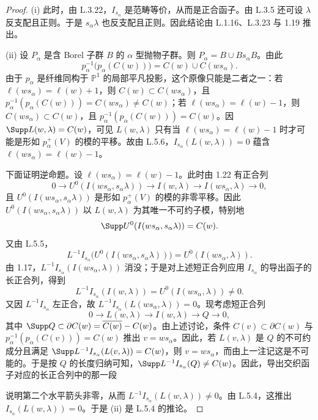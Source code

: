\begin{proof}
(i) 此时，由 L.3.22，$I_{s_\alpha}$ 是范畴等价，从而是正合函子。由 L.3.5 还可设 $\lambda$ 反支配且正则。于是 $s_\alpha\lambda$ 也反支配且正则。因此结论由 L.1.16、L.3.23 与 1.19 推出。

(ii) 设 $P_\alpha$ 是含 Borel 子群 $B$ 的 $\alpha$ 型抛物子群。则 $P_\alpha=B\cup Bs_\alpha B$。由此
$$p_\alpha^{-1}\bigl(p_\alpha(C(w))\bigr)=C(w)\cup C(ws_\alpha).$$
由于 $p_\alpha$ 是纤维同构于 $\mathbb{P}^1$ 的局部平凡投影，这个原像只能是二者之一：若 $\ell(ws_\alpha)=\ell(w)+1$，则 $C(w)\subset C(ws_\alpha)$，且 $p_\alpha^{-1}(p_\alpha(C(w)))=C(ws_\alpha)\neq C(w)$；若 $\ell(ws_\alpha)=\ell(w)-1$，则 $C(ws_\alpha)\subset C(w)$，且 $p_\alpha^{-1}(p_\alpha(C(w)))=C(w)$。因 $\Supp L(w,\lambda)=C(w)$，可见 $L(w,\lambda)$ 只有当 $\ell(ws_\alpha)=\ell(w)-1$ 时才可能是形如 $p_\alpha^+(V)$ 的模的平移。故由 L.5.6，$I_{s_\alpha}(L(w,\lambda))=0$ 蕴含 $\ell(ws_\alpha)=\ell(w)-1$。

下面证明逆命题。设 $\ell(ws_\alpha)=\ell(w)-1$。此时由 1.22 有正合列
$$0\longrightarrow U^0(I(ws_\alpha,s_\alpha\lambda))\longrightarrow I(w,\lambda)\longrightarrow I(ws_\alpha,\lambda)\longrightarrow0,$$
且 $U^0(I(ws_\alpha,s_\alpha\lambda))$ 是形如 $p_\alpha^+(V)$ 的模的非零平移。因此 $U^0(I(ws_\alpha,s_\alpha\lambda))$ 以 $L(w,\lambda)$ 为其唯一不可约子模，特别地
$$\Supp U^0(I(ws_\alpha,s_\alpha\lambda))=C(w).$$
又由 L.5.5，
$$L^{-1}I_{s_\alpha}\bigl(U^0(I(ws_\alpha,s_\alpha\lambda))\bigr)=U^0(I(ws_\alpha,\lambda)).$$
由 1.17，$L^{-1}I_{s_\alpha}(I(ws_\alpha,\lambda))$ 消没；于是对上述短正合列应用 $I_{s_\alpha}$ 的导出函子的长正合列，得到
$$L^{-1}I_{s_\alpha}(I(w,\lambda))=U^0(I(ws_\alpha,\lambda))\neq0.$$
又因 $L^{-1}I_{s_\alpha}$ 左正合，故 $L^{-1}I_{s_\alpha}(L(ws_\alpha,\lambda))=0$。现考虑短正合列
$$0\longrightarrow L(w,\lambda)\longrightarrow I(w,\lambda)\longrightarrow Q\longrightarrow0,$$
其中 $\Supp Q\subset\partial C(w)=\overline{C(w)}-C(w)$。由上述讨论，条件 $C(v)\subset\partial C(w)$ 与 $p_\alpha^{-1}(p_\alpha(C(v)))=C(w)$ 推出 $v=ws_\alpha$。因此，若 $L(v,\lambda)$ 是 $Q$ 的不可约成分且满足 $\Supp L^{-1}I_{s_\alpha}(L(v,\lambda))=C(w)$，则 $v=ws_\alpha$，而由上一注记这是不可能的。于是按 $Q$ 的长度归纳可知，$\Supp L^{-1}I_{s_\alpha}(Q)\neq C(w)$。因此，导出交织函子对应的长正合列中的那一段
\begin{center}
\end{center}
说明第二个水平箭头非零，从而 $L^{-1}I_{s_\alpha}(L(w,\lambda))\neq0$。由 L.5.4，这推出 $I_{s_\alpha}(L(w,\lambda))=0$。于是 (ii) 是 L.5.4 的推论。
\end{proof}

